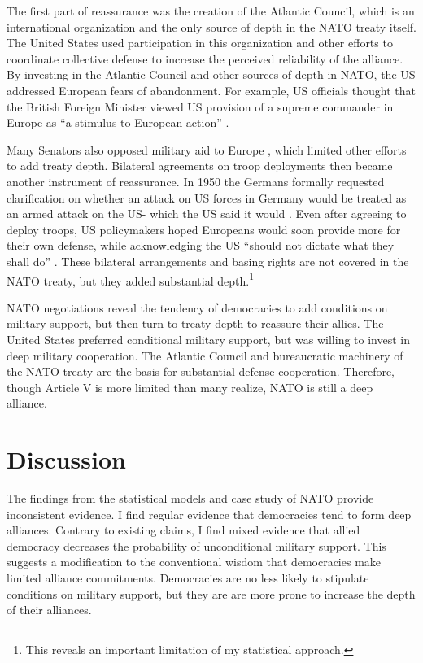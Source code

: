 \documentclass[12pt]{article}
\begin{document}
The first part of reassurance was the creation of the Atlantic Council, which is an international organization and the only source of depth in the NATO treaty itself. 
The United States used participation in this organization and other efforts to coordinate collective defense to increase the perceived reliability of the alliance. 
By investing in the Atlantic Council and other sources of depth in NATO, the US addressed European fears of abandonment. 
For example, US officials thought that the British Foreign Minister viewed US provision of a supreme commander in Europe as ``a stimulus to European action'' \citep{Acheson1950}. 


Many Senators also opposed military aid to Europe \citep[pg 285]{Acheson1969}, which limited other efforts to add treaty depth. 
Bilateral agreements on troop deployments then became another instrument of reassurance. 
In 1950 the Germans formally requested clarification on whether an attack on US forces in Germany would be treated as an armed attack on the US- which the US said it would \citep[pg. 395]{Acheson1969}.  
Even after agreeing to deploy troops, US policymakers hoped Europeans would soon provide more for their own defense, while acknowledging the US ``should not dictate what they shall do'' \citep[pg. 2]{Johnson1950}. 
These bilateral arrangements and basing rights are not covered in the NATO treaty, but they added substantial depth.\footnote{This reveals an important limitation of my statistical approach.}  


NATO negotiations reveal the tendency of democracies to add conditions on military support, but then turn to treaty depth to reassure their allies. 
The United States preferred conditional military support, but was willing to invest in deep military cooperation. 
The Atlantic Council and bureaucratic machinery of the NATO treaty are the basis for substantial defense cooperation. 
Therefore, though Article V is more limited than many realize, NATO is still a deep alliance. 


\section{Discussion}


The findings from the statistical models and case study of NATO provide inconsistent evidence. 
I find regular evidence that democracies tend to form deep alliances.
Contrary to existing claims, I find mixed evidence that allied democracy decreases the probability of unconditional military support. 
This suggests a modification to the conventional wisdom that democracies make limited alliance commitments.
Democracies are no less likely to stipulate conditions on military support, but they are are more prone to increase the depth of their alliances. 
\end{document}
